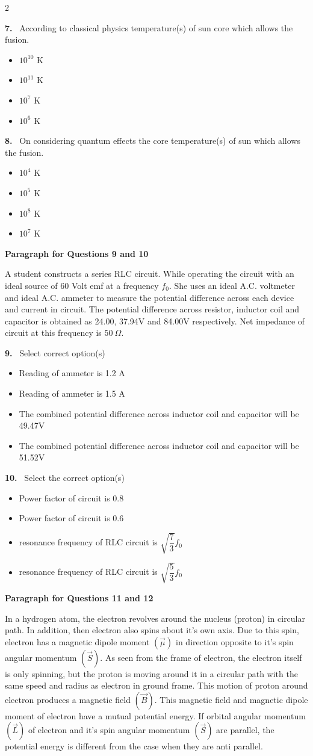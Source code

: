 \documentclass[10pt]{extarticle}
\newcommand{\qn}[1]{\par\smallskip\noindent\textbf{#1.}~}
\newcommand{\paraq}[2]{\par\smallskip\noindent\textbf{Paragraph for Questions #1 and #2}\par}
\newenvironment{qoptions}{\begin{itemize}[leftmargin=1.8em,itemsep=1pt,topsep=2pt,label={}]}{\end{itemize}}
\newcommand{\opt}[2]{\item[(#1)] #2}
\begin{document}
\begin{multicols}{2}
\qn{7} According to classical physics temperature(s) of sun core which allows the fusion.
\begin{qoptions}
\opt{A}{$10^{10}$ K}
\opt{B}{$10^{11}$ K}
\opt{C}{$10^{7}$ K}
\opt{D}{$10^{6}$ K}
\end{qoptions}

\qn{8} On considering quantum effects the core temperature(s) of sun which allows the fusion.
\begin{qoptions}
\opt{A}{$10^{4}$ K}
\opt{B}{$10^{5}$ K}
\opt{C}{$10^{8}$ K}
\opt{D}{$10^{7}$ K}
\end{qoptions}

\paraq{9}{10}
A student constructs a series RLC circuit. While operating the circuit with an ideal source of 60 Volt emf at a frequency $f_0$. She uses an ideal A.C. voltmeter and ideal A.C. ammeter to measure the potential difference across each device and current in circuit. The potential difference across resistor, inductor coil and capacitor is obtained as 24.00, 37.94V and 84.00V respectively. Net impedance of circuit at this frequency is $50\ \Omega$.

\qn{9} Select correct option(s)
\begin{qoptions}
\opt{A}{Reading of ammeter is 1.2 A}
\opt{B}{Reading of ammeter is 1.5 A}
\opt{C}{The combined potential difference across inductor coil and capacitor will be 49.47V}
\opt{D}{The combined potential difference across inductor coil and capacitor will be 51.52V}
\end{qoptions}

\qn{10} Select the correct option(s)
\begin{qoptions}
\opt{A}{Power factor of circuit is 0.8}
\opt{B}{Power factor of circuit is 0.6}
\opt{C}{resonance frequency of RLC circuit is $\sqrt{\dfrac73}f_0$}
\opt{D}{resonance frequency of RLC circuit is $\sqrt{\dfrac53}f_0$}
\end{qoptions}

\paraq{11}{12}
In a hydrogen atom, the electron revolves around the nucleus (proton) in circular path. In addition, then electron also spins about it's own axis. Due to this spin, electron has a magnetic dipole moment $(\vec\mu)$ in direction opposite to it's spin angular momentum $\left(\vec S\right)$. As seen from the frame of electron, the electron itself is only spinning, but the proton is moving around it in a circular path with the same speed and radius as electron in ground frame. This motion of proton around electron produces a magnetic field $\left(\vec B\right)$. This magnetic field and magnetic dipole moment of electron have a mutual potential energy. If orbital angular momentum $\left(\vec L\right)$ of electron and it's spin angular momentum $\left(\vec S\right)$ are parallel, the potential energy is different from the case when they are anti parallel.


\end{multicols}
\end{document}
